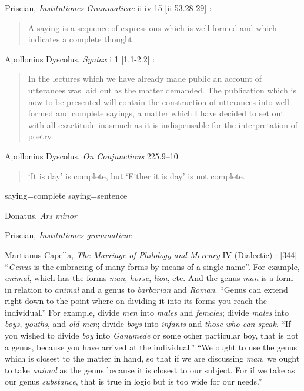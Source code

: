 \documentclass{article}
\begin{document}
Priscian, {\em Institutiones Grammaticae} ii iv 15 [ii 53.28-29] \cite{barnes}:

\begin{quote}
A saying is a sequence of expressions which is well formed and which indicates a complete thought.
\end{quote}

Apollonius Dyscolus, {\em Syntax} i 1 [1.1-2.2] \cite[p.~208]{barnes}:

\begin{quote}
In the lectures which we have already made public an account of utterances was laid out as the matter demanded. The publication which is now to be presented will contain the construction of utterances into well-formed and complete sayings, a matter which I have decided to set out with all exactitude inasmuch as it is indispensable for the interpretation of poetry.
\end{quote}

Apollonius Dyscolus, {\em On Conjunctions} 225.9--10 \cite[p.~208]{barnes}:

\begin{quote}
`It is day' is complete, but `Either it is day' is not complete.
\end{quote}

saying=complete saying=sentence

Donatus, {\em Ars minor}

Priscian, {\em Institutiones grammaticae}

Martianus Capella, {\em The Marriage of Philology and Mercury} IV (Dialectic) \cite[p.~112]{capellaII}:
[344] ``{\em Genus} is the embracing of many forms by means of a single name''. For example, {\em animal},
which has the forms {\em man}, {\em horse}, {\em lion}, etc. And the genus {\em man} is a form in relation to
{\em animal} and a genus to {\em barbarian} and {\em Roman}.
``Genus can extend right down to the point where on dividing it into its forms
you reach the individual.'' For example, divide {\em men} into {\em males} and {\em females};
divide {\em males} into {\em boys}, {\em youths}, and {\em old men}; divide
{\em boys} into {\em infants} and {\em those who can speak}.
``If you wished to divide {\em boy} into {\em Ganymede} or some other particular boy,
that is not a genus, because you have arrived at the individual.''
``We ought to use the genus which is closest to the matter in
hand, so that if we are discussing {\em man}, we ought to take {\em animal} as
the genus because it is closest to our subject. For if we take as our
genus {\em substance}, that is true in logic but is too wide for our needs.''
\end{document}
